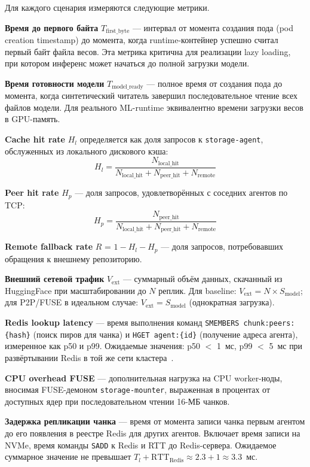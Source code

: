 Для каждого сценария измеряются следующие метрики.

\textbf{Время до первого байта} $T_{\mathrm{first\_byte}}$ --- интервал от момента создания пода (pod creation timestamp) до момента, когда runtime-контейнер успешно считал первый байт файла весов. Эта метрика критична для реализации lazy loading, при котором инференс может начаться до полной загрузки модели.

\textbf{Время готовности модели} $T_{\mathrm{model\_ready}}$ --- полное время от создания пода до момента, когда синтетический читатель завершил последовательное чтение всех файлов модели. Для реального ML-runtime эквивалентно времени загрузки весов в GPU-память.

\textbf{Cache hit rate} $H_l$ определяется как доля запросов к \texttt{storage-agent}, обслуженных из локального дискового кэша:
\[
  H_l = \frac{N_{\mathrm{local\_hit}}}{N_{\mathrm{local\_hit}} + N_{\mathrm{peer\_hit}} + N_{\mathrm{remote}}}
\]

\textbf{Peer hit rate} $H_p$ --- доля запросов, удовлетворённых с соседних агентов по TCP:
\[
  H_p = \frac{N_{\mathrm{peer\_hit}}}{N_{\mathrm{local\_hit}} + N_{\mathrm{peer\_hit}} + N_{\mathrm{remote}}}
\]

\textbf{Remote fallback rate} $R$ = $1 - H_l - H_p$ --- доля запросов, потребовавших обращения к внешнему репозиторию.

\textbf{Внешний сетевой трафик} $V_{\mathrm{ext}}$ --- суммарный объём данных, скачанный из HuggingFace при масштабировании до $N$ реплик. Для baseline: $V_{\mathrm{ext}} = N \times S_{\mathrm{model}}$; для P2P/FUSE в идеальном случае: $V_{\mathrm{ext}} = S_{\mathrm{model}}$ (однократная загрузка).

\textbf{Redis lookup latency} --- время выполнения команд \texttt{SMEMBERS chunk:peers:\{hash\}} (поиск пиров для чанка) и \texttt{HGET agent:\{id\}} (получение адреса агента), измеренное как p50 и p99. Ожидаемые значения: p50 $<$ 1~мс, p99 $<$ 5~мс при развёртывании Redis в той же сети кластера~\cite{redis_sentinel_docs}.

\textbf{CPU overhead FUSE} --- дополнительная нагрузка на CPU worker-ноды, вносимая FUSE-демоном \texttt{storage-mounter}, выраженная в процентах от доступных ядер при последовательном чтении 16-МБ чанков.

\textbf{Задержка репликации чанка} --- время от момента записи чанка первым агентом до его появления в реестре Redis для других агентов. Включает время записи на NVMe, время команды \texttt{SADD} к Redis и RTT до Redis-сервера. Ожидаемое суммарное значение не превышает $T_l + \mathrm{RTT_{Redis}} \approx 2.3 + 1 \approx 3.3$~мс.

